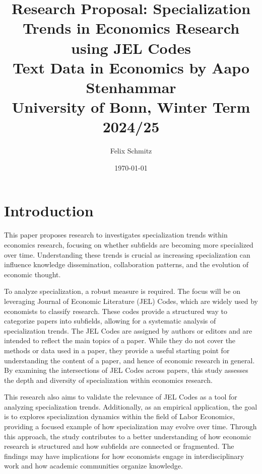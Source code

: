 \documentclass[11pt, a4paper, leqno]{article}
\begin{document}
\title{Research Proposal: Specialization Trends in Economics Research using JEL Codes \\
Text Data in Economics by Aapo Stenhammar \\
University of Bonn, Winter Term 2024/25}

\author{Felix Schmitz\footnotemark[1]}

\date{
    \today
}

\maketitle
{}

\section{Introduction}
This paper proposes research to investigates specialization trends within economics research, focusing on whether subfields are becoming more specialized over time.
Understanding these trends is crucial as increasing specialization can influence knowledge dissemination, collaboration patterns, and the evolution of economic thought.

To analyze specialization, a robust measure is required.
The focus will be on leveraging Journal of Economic Literature (JEL) Codes, which are widely used by economists to classify research.
These codes provide a structured way to categorize papers into subfields, allowing for a systematic analysis of specialization trends.
The JEL Codes are assigned by authors or editors and are intended to reflect the main topics of a paper.
While they do not cover the methods or data used in a paper, they provide a useful starting point for understanding the content of a paper, and hence of economic research in general.
By examining the intersections of JEL Codes across papers, this study assesses the depth and diversity of specialization within economics research.

This research also aims to validate the relevance of JEL Codes as a tool for analyzing specialization trends.
Additionally, as an empirical application, the goal is to explores specialization dynamics within the field of Labor Economics, providing a focused example of how specialization may evolve over time.
Through this approach, the study contributes to a better understanding of how economic research is structured and how subfields are connected or fragmented.
The findings may have implications for how economists engage in interdisciplinary work and how academic communities organize knowledge.
\end{document}
